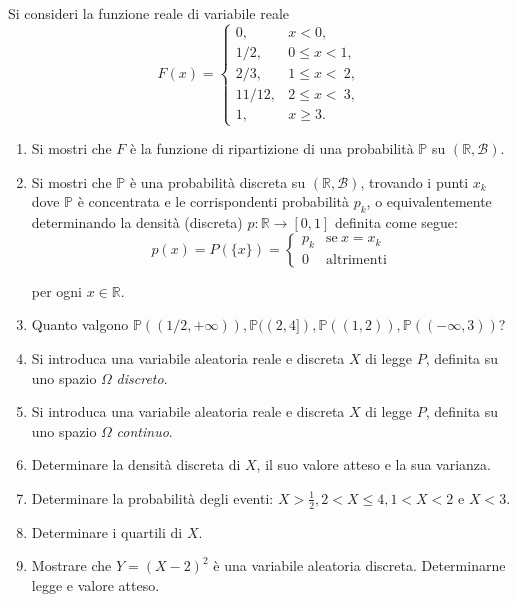 Si consideri la funzione reale di variabile reale
\begin{equation*}
F( x) =\begin{cases}
0, & x< 0,\\
1/2, & 0\leq x< 1,\\
2/3, & 1\leq x< \ 2,\\
11/12, & 2\leq x< \ 3,\\
1, & x\geq 3.
\end{cases}
\end{equation*}
\begin{enumerate}
\item Si mostri che $F$ è la funzione di ripartizione di una probabilità $\mathbb{P}$ su $(\mathbb{R} ,\mathcal{B})$.
\item Si mostri che $\mathbb{P}$ è una probabilità discreta su $(\mathbb{R} ,\mathcal{B})$, trovando i punti $x_{k}$ dove $\mathbb{P}$ è concentrata e le corrispondenti probabilità $p_{k}$, o equivalentemente determinando la densità (discreta) $p:\mathbb{R}\rightarrow [ 0,1]$ definita come segue:\begin{equation*}
p( x) =P(\{x\}) =\begin{cases}
p_{k} & \text{se} \ x=x_{k}\\
0 & \text{altrimenti}
\end{cases}
\end{equation*}

per ogni $x\in \mathbb{R}$.
\item Quanto valgono $\mathbb{P}(( 1/2,+\infty )) ,\mathbb{P}(( 2,4]) ,\mathbb{P}(( 1,2)) ,\mathbb{P}(( -\infty ,3))$?
\item Si introduca una variabile aleatoria reale e discreta $X$ di legge $P$, definita su uno spazio $\Omega $ \textit{discreto}.
\item Si introduca una variabile aleatoria reale e discreta $X$ di legge $P$, definita su uno spazio $\Omega $ \textit{continuo}.
\item Determinare la densità discreta di $X$, il suo valore atteso e la sua varianza.
\item Determinare la probabilità degli eventi: $X >\frac{1}{2} ,2< X\leq 4,1< X< 2$ e $X< 3$.
\item Determinare i quartili di $X$.
\item Mostrare che $Y=( X-2)^{2}$ è una variabile aleatoria discreta. Determinarne legge e valore atteso.
\end{enumerate}
\subsection{}

